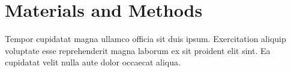 
\chapter{Materials and Methods}\label{ch:materialsAndMethods}

Tempor cupidatat magna ullamco officia sit duis ipsum. Exercitation aliquip voluptate esse reprehenderit magna laborum ex sit proident elit sint. Ea cupidatat velit nulla aute dolor occaecat aliqua.
